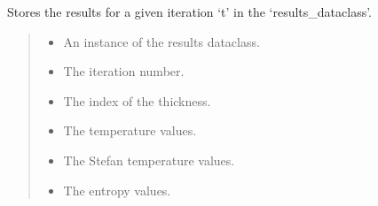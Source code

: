 \documentclass[a4paper,11pt,english,openany]{sphinxmanual}
\begin{document}
\begin{fulllineitems}
\begin{fulllineitems}
\label{\detokenize{api/spyice.parameters.results_params:src.spyice.parameters.results_params.ResultsParams.store_results_for_iter_t}}
\pysigstartsignatures
\pysiglinewithargsret
{}
{\sphinxparamcomma {}\sphinxparamcomma {}\sphinxparamcomma {}\sphinxparamcomma {}\sphinxparamcomma {}\sphinxparamcomma {}\sphinxparamcomma {}\sphinxparamcomma {}\sphinxparamcomma {}\sphinxparamcomma {}\sphinxparamcomma {}\sphinxparamcomma {}\sphinxparamcomma {}\sphinxparamcomma {}\sphinxparamcomma {}}
{}
\pysigstopsignatures
\sphinxAtStartPar
Stores the results for a given iteration ‘t’ in the ‘results\_dataclass’.
\begin{quote}\begin{description}
\begin{itemize}
\item {} 
\sphinxAtStartPar
{} \textendash{} An instance of the results dataclass.

\item {} 
\sphinxAtStartPar
{} \textendash{} The iteration number.

\item {} 
\sphinxAtStartPar
{} \textendash{} The index of the thickness.

\item {} 
\sphinxAtStartPar
{} \textendash{} The temperature values.

\item {} 
\sphinxAtStartPar
{} \textendash{} The Stefan temperature values.

\item {} 
\sphinxAtStartPar
{} \textendash{} The entropy values.


\end{itemize}
\end{description}
\end{quote}
\end{fulllineitems}
\end{fulllineitems}
\end{document}
